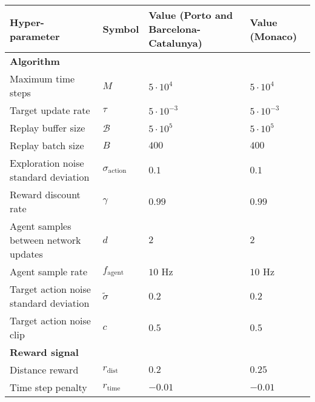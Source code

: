
\begin{table}[htb!]
\centering
\small
\begin{tabularx}{0.95\textwidth}{RCLN} 
    \hline
    \textbf{Hyper-parameter} & \textbf{Symbol} & \textbf{Value (Porto and Barcelona-Catalunya)} & \textbf{Value (Monaco)} \\ 
    \hline
    \textbf{Algorithm}                      &                           &                   &\\
    Maximum time steps                      & $M$                       & $5 \cdot 10^{4}$  & $5 \cdot 10^{4}$ \\
    Target update rate                      & $\tau$                    & $5\cdot10^{-3}$   & $5\cdot10^{-3}$ \\
    Replay buffer size                      & $\mathcal{B}$             & $5\cdot 10^5$     & $5\cdot 10^5$ \\
    Replay batch size                       & $B$                       & $400$             & $400$  \\
    Exploration noise standard deviation    & $\sigma_{\text{action}}$  & $0.1$             & $0.1$ \\
    Reward discount rate                    & $\gamma$                  & $0.99$            & $0.99$ \\
    Agent samples between network updates   & $d$                       & $2$               & $2$ \\
    Agent sample rate                       & $f_{\text{agent}}$        & $10$ Hz           & $10$ Hz \\
    Target action noise standard deviation  & $\tilde{\sigma}$          & $0.2$             & $0.2$ \\ 
    Target action noise clip                & $c$                       & $0.5$             & $0.5$ \\
    \textbf{Reward signal}                  &                           &                   & \\
    Distance reward                         & $r_{\text{dist}}$         & $0.2$             & $0.25$  \\ 
    Time step penalty                       & $r_{\text{time}}$         & $-0.01$            & $-0.01$ \\

\end{tabularx}
\end{table}
